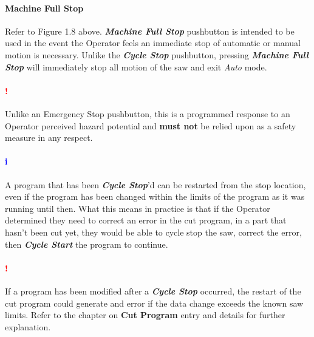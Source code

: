 \paragraph{Machine Full Stop} Refer to Figure 1.8 above. \textbf{\textit{Machine Full Stop}} pushbutton is intended to be used in the event the Operator feels an immediate stop of automatic or manual motion is necessary. Unlike the \textbf{\textit{Cycle Stop}} pushbutton, pressing \textbf{\textit{Machine Full Stop}} will immediately stop all motion of the saw and exit \textit{Auto} mode. 
\paragraph*{\textbf{{\LARGE \textcolor{red}{!}}}}Unlike an Emergency Stop pushbutton, this is a programmed response to an Operator perceived hazard potential and \textbf{must not} be relied upon as a safety measure in any respect.
\paragraph*{\textbf{\LARGE \textcolor{blue}{i}}} A program that has been \textbf{\textit{Cycle Stop}}'d can be restarted from the stop location, even if the program has been changed within the limits of the program as it was running until then. What this means in practice is that if the Operator determined they need to correct an error in the cut program, in a part that hasn't been cut yet, they would be able to cycle stop the saw, correct the error, then \textbf{\textit{Cycle Start}} the program to continue.
\paragraph*{\textbf{{\LARGE \textcolor{red}{!}}}} If a program has been modified after a \textbf{\textit{Cycle Stop}} occurred, the restart of the cut program could generate and error if the data change exceeds the known saw limits. Refer to the chapter on \textbf{Cut Program} entry and details for further explanation.